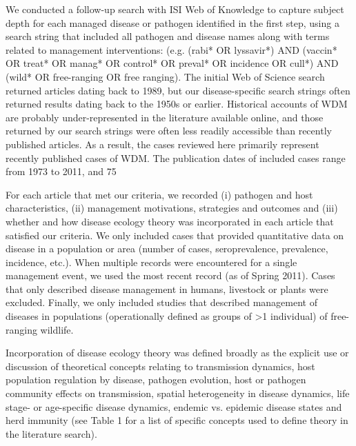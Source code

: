 We conducted a follow-up search with ISI Web of Knowledge to capture subject depth for each managed disease or pathogen identified in the first step, using a search string that included all pathogen and disease names along with terms related to management interventions: (e.g. (rabi* OR lyssavir*) AND (vaccin* OR treat* OR manag* OR control* OR preval* OR incidence OR cull*) AND (wild* OR free-ranging OR free ranging).
The initial Web of Science search returned articles dating back to 1989, but our disease-specific search strings often returned results dating back to the 1950s or earlier.
Historical accounts of WDM are probably under-represented in the literature available online, and those returned by our search strings were often less readily accessible than recently published articles.
As a result, the cases reviewed here primarily represent recently published cases of WDM. The publication dates of included cases range from 1973 to 2011, and 75%

For each article that met our criteria, we recorded (i) pathogen and host characteristics, (ii) management motivations, strategies and outcomes and (iii) whether and how disease ecology theory was incorporated in each article that satisfied our criteria.
We only included cases that provided quantitative data on disease in a population or area (number of cases, seroprevalence, prevalence, incidence, etc.).
When multiple records were encountered for a single management event, we used the most recent record (as of Spring 2011). Cases that only described disease management in humans, livestock or plants were excluded.
Finally, we only included studies that described management of diseases in populations (operationally defined as groups of >1 individual) of free-ranging wildlife.

Incorporation of disease ecology theory was defined broadly as the explicit use or discussion of theoretical concepts relating to transmission dynamics, host population regulation by disease, pathogen evolution, host or pathogen community effects on transmission, spatial heterogeneity in disease dynamics, life stage- or age-specific disease dynamics, endemic vs. epidemic disease states and herd immunity (see Table 1 for a list of specific concepts used to define theory in the literature search).

